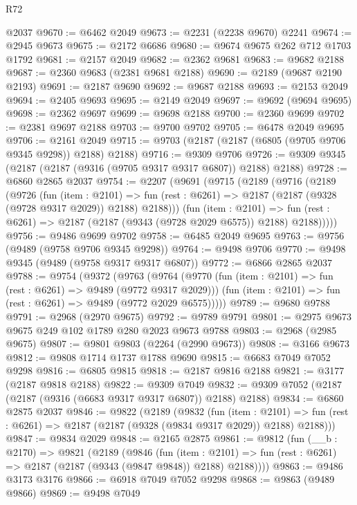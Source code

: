 \begin{lexlean}{R72}
\begin{coremodule}
    @2037
@9670 := @6462 @2049
@9673 := @2231 (@2238 @9670) @2241
@9674 := @2945 @9673
@9675 := @2172 @6686
@9680 := @9674 @9675 @262 @712 @1703 @1792
@9681 := @2157 @2049
@9682 := @2362 @9681
@9683 := @9682 @2188
@9687 := @2360 @9683 (@2381 @9681 @2188)
@9690 := @2189 (@9687 @2190 @2193)
@9691 := @2187 @9690
@9692 := @9687 @2188
@9693 := @2153 @2049
@9694 := @2405 @9693
@9695 := @2149 @2049
@9697 := @9692 (@9694 @9695)
@9698 := @2362 @9697
@9699 := @9698 @2188
@9700 := @2360 @9699
@9702 := @2381 @9697 @2188
@9703 := @9700 @9702
@9705 := @6478 @2049 @9695
@9706 := @2161 @2049
@9715 := @9703 (@2187 (@2187 (@6805 (@9705 @9706 @9345 @9298)) @2188) @2188)
@9716 := @9309 @9706
@9726 := @9309 @9345 (@2187 (@2187 (@9316 (@9705 @9317 @9317 @6807)) @2188) @2188)
@9728 := @6860 @2865 @2037
@9754 := @2207
    (@9691
      (@9715
        (@2189
          (@9716
            (@2189
              (@9726
                (fun (item : @2101) =>
                fun (rest : @6261) => @2187 (@2187 (@9328 (@9728 @9317 @2029)) @2188) @2188)))
            (fun (item : @2101) =>
            fun (rest : @6261) => @2187 (@2187 (@9343 (@9728 @2029 @6575)) @2188) @2188)))))
@9756 := @9486 @9699 @9702
@9758 := @6485 @2049 @9695
@9763 := @9756 (@9489 (@9758 @9706 @9345 @9298))
@9764 := @9498 @9706
@9770 := @9498 @9345 (@9489 (@9758 @9317 @9317 @6807))
@9772 := @6866 @2865 @2037
@9788 := @9754
    (@9372
      (@9763
        (@9764
          (@9770 (fun (item : @2101) => fun (rest : @6261) => @9489 (@9772 @9317 @2029)))
          (fun (item : @2101) => fun (rest : @6261) => @9489 (@9772 @2029 @6575)))))
@9789 := @9680 @9788
@9791 := @2968 (@2970 @9675)
@9792 := @9789 @9791
@9801 := @2975 @9673 @9675 @249 @102 @1789 @280 @2023 @9673 @9788
@9803 := @2968 (@2985 @9675)
@9807 := @9801 @9803 (@2264 (@2990 @9673))
@9808 := @3166 @9673
@9812 := @9808 @1714 @1737 @1788 @9690
@9815 := @6683 @7049 @7052 @9298
@9816 := @6805 @9815
@9818 := @2187 @9816 @2188
@9821 := @3177 (@2187 @9818 @2188)
@9822 := @9309 @7049
@9832 := @9309 @7052 (@2187 (@2187 (@9316 (@6683 @9317 @9317 @6807)) @2188) @2188)
@9834 := @6860 @2875 @2037
@9846 := @9822
    (@2189
      (@9832
        (fun (item : @2101) =>
        fun (rest : @6261) => @2187 (@2187 (@9328 (@9834 @9317 @2029)) @2188) @2188)))
@9847 := @9834 @2029
@9848 := @2165 @2875
@9861 := @9812
    (fun (__b : @2170) =>
    @9821
      (@2189
        (@9846
          (fun (item : @2101) =>
          fun (rest : @6261) => @2187 (@2187 (@9343 (@9847 @9848)) @2188) @2188))))
@9863 := @9486 @3173 @3176
@9866 := @6918 @7049 @7052 @9298
@9868 := @9863 (@9489 @9866)
@9869 := @9498 @7049

\end{coremodule}
\end{lexlean}
